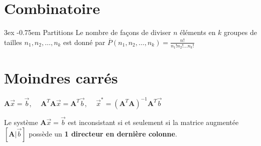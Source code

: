 \documentclass[landscape]{article}
\makeatletter
\renewcommand{\paragraph}{\@startsection{paragraph}{4}{\z@}%
                                    {3ex}%
                                    {-0.75em}%
                                    {\normalfont\normalsize\bfseries}}
\makeatother
\begin{document}
\begin{multicols*}{3}
       \color{gray}
       \section*{Combinatoire}
       \color{black}

       \paragraph{Partitions} Le nombre de façons de diviser $n$ éléments en $k$ groupes de tailles $n_1, n_2, \ldots, n_k$ est donné par $\overline{P}(n_1, n_2, \ldots, n_k) = \frac{n!}{n_1!n_2!\ldots n_k!}$

       \section*{Moindres carrés}
       $\textbf{A}\vec{x} = \vec{b}$, $\quad\textbf{A}^T\textbf{A}\vec{x} = \textbf{A}^T\vec{b}$, $\quad\vec{x}^* = (\textbf{A}^T\textbf{A})^{-1}\textbf{A}^T\vec{b}$\vspace*{0.5em}

       \par Le système $\textbf{A}\vec{x} = \vec{b}$ est inconsistant si et seulement si la matrice augmentée $[\textbf{A}|\vec{b}]$ possède un \textbf{1 directeur en dernière colonne}.


\end{multicols*}
\end{document}
